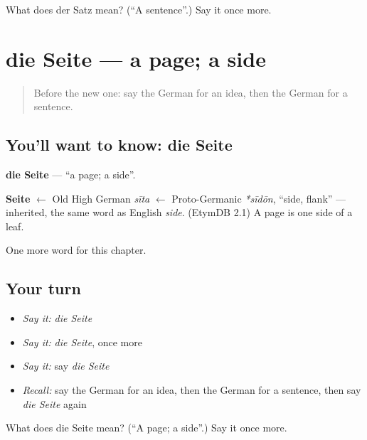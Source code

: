 \begin{tcolorbox}[breakable,colback=teal!4,colframe=teal!35!black,title={Before you move on}]
What does der Satz mean? (\textquotedblleft{}A sentence\textquotedblright{}.) Say it once more.
\end{tcolorbox}
\section[die Seite]{die Seite — a page; a side}

\label{lesson:GE-C128-seite}



\begin{quote}
Before the new one: say the German for an idea, then the German for a sentence.
\end{quote}

\subsection*{You'll want to know: die Seite}
\textbf{die Seite} — \textquotedblleft{}a page; a side\textquotedblright{}.

\begin{cousinweb}
\textbf{Seite} $\leftarrow$ Old High German \emph{sīta} $\leftarrow$ Proto-Germanic \emph{*sīdōn}, \textquotedblleft{}side, flank\textquotedblright{} — inherited, the same word as English \emph{side}. (EtymDB 2.1) A page is one side of a leaf.
\end{cousinweb}

\begin{grammarlens}[title={What you've built}]
One more word for this chapter.
\end{grammarlens}

\subsection*{Your turn}
\begin{itemize}
\raggedright
  \item \emph{Say it:} \emph{die Seite}
  \item \emph{Say it:} \emph{die Seite}, once more
  \item \emph{Say it:} say \emph{die Seite}
  \item \emph{Recall:} say the German for an idea, then the German for a sentence, then say \emph{die Seite} again
\end{itemize}

\begin{tcolorbox}[breakable,colback=teal!4,colframe=teal!35!black,title={Before you move on}]
What does die Seite mean? (\textquotedblleft{}A page; a side\textquotedblright{}.) Say it once more.
\end{tcolorbox}

